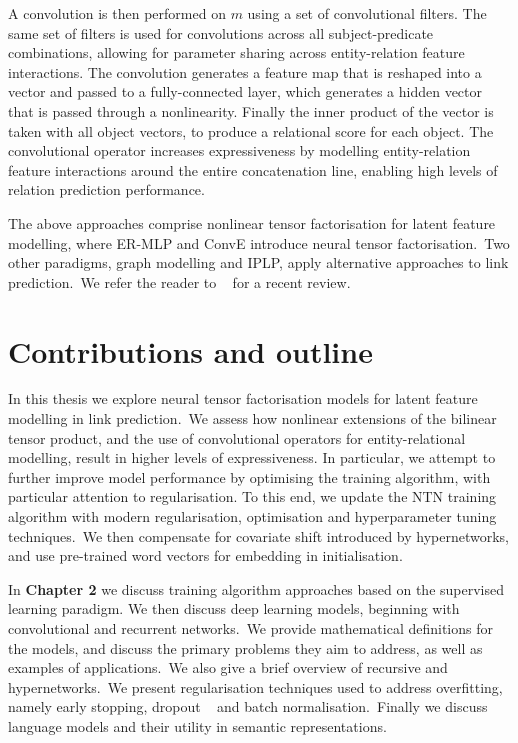 \noindent A convolution is then performed on $ m $ using a set of convolutional filters. The same set of filters is used for convolutions across all subject-predicate combinations, allowing for parameter sharing across entity-relation feature interactions. The convolution generates a feature map that is reshaped into a vector and passed to a fully-connected layer, which generates a hidden vector that is passed through a nonlinearity. Finally the inner product of the vector is taken with all object vectors, to produce a relational score for each object. The convolutional operator increases expressiveness by modelling entity-relation feature interactions around the entire concatenation line, enabling high levels of relation prediction performance. \par

\noindent The above approaches comprise nonlinear tensor factorisation for latent feature modelling, where ER-MLP and ConvE introduce neural tensor factorisation.\ Two other paradigms, graph modelling and IPLP, apply alternative approaches to link prediction.\ We refer the reader to \unskip~\citep{Nickel_2016} for a recent review. \par



\section{Contributions and outline} %

\noindent In this thesis we explore neural tensor factorisation models for latent feature modelling in link prediction.\ We assess how nonlinear extensions of the bilinear tensor product, and the use of convolutional operators for entity-relational modelling, result in higher levels of expressiveness. In particular, we attempt to further improve model performance by optimising the training algorithm, with particular attention to regularisation. To this end, we update the NTN training algorithm with modern regularisation, optimisation and hyperparameter tuning techniques.\ We then compensate for covariate shift introduced by hypernetworks, and use pre-trained word vectors for embedding in initialisation. \par

\noindent In \textbf{Chapter 2} we discuss training algorithm approaches based on the supervised learning paradigm. We then discuss deep learning models, beginning with convolutional and recurrent networks.\ We provide mathematical definitions for the models, and discuss the primary problems they aim to address, as well as examples of applications.\ We also give a brief overview of recursive and hypernetworks.\ We present regularisation techniques used to address overfitting, namely early stopping, dropout \unskip ~\citep{srivastava2014dropout} and batch normalisation.\ Finally we discuss language models and their utility in semantic representations. \par

